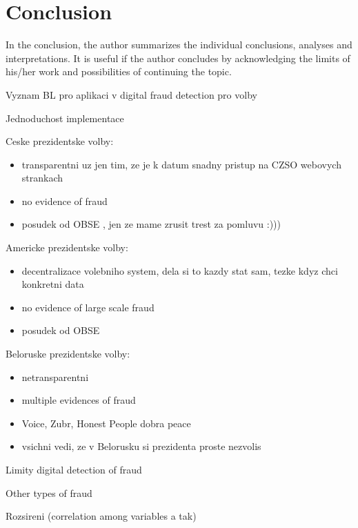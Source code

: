 \chapter*{Conclusion}

In the conclusion, the author summarizes the individual conclusions, analyses 
and interpretations. It is useful if the author concludes by acknowledging the 
limits of his/her work and possibilities of continuing the topic.

\begin{koment}

    Vyznam BL pro aplikaci v digital fraud detection pro volby 

    Jednoduchost implementace 

    Ceske prezidentske volby: 
    \begin{itemize}
        \item transparentni uz jen tim, ze je k datum snadny pristup na CZSO webovych strankach 
        \item no evidence of fraud 
        \item posudek od OBSE , jen ze mame zrusit trest za pomluvu :)))
    \end{itemize}

    Americke prezidentske volby: 
    \begin{itemize}
        \item decentralizace volebniho system, dela si to kazdy stat sam, tezke kdyz chci konkretni data 
        \item no evidence of large scale fraud 
        \item posudek od OBSE
    \end{itemize}

    Beloruske prezidentske volby: 
    \begin{itemize}
        \item netransparentni
        \item multiple evidences of fraud 
        \item Voice, Zubr, Honest People dobra peace   
        \item vsichni vedi, ze v Belorusku si prezidenta proste nezvolis 
    \end{itemize}

    Limity digital detection of fraud 

    Other types of fraud

    Rozsireni (correlation among variables a tak) 

\end{koment}
